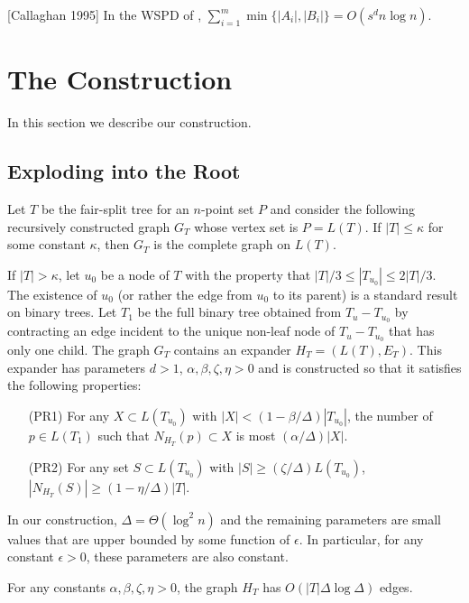 \documentclass{patmorin}
\begin{document}
\begin{lem}[Callaghan 1995]
  In the WSPD of ,
   $\sum_{i=1}^m\min\{|A_i|,|B_i|\} = O(s^d n\log n)$.
\end{lem}


\section{The Construction}

In this section we describe our construction.
\subsection{Exploding into the Root}

Let $T$ be the fair-split tree for an $n$-point set $P$ and consider
the following recursively constructed graph $G_{T}$ whose vertex set
is $P=L(T)$.  If $|T| \le \kappa$ for some constant $\kappa$, then $G_T$
is the complete graph on $L(T)$.

If $|T|>\kappa$, let $u_0$ be a node of $T$ with the property that
$|T|/3\le |T_{u_0}|\le 2|T|/3$.  The existence of $u_0$ (or rather
the edge from $u_0$ to its parent) is a standard result on binary
trees.  Let $T_1$ be the full binary tree obtained from
$T_u-T_{u_0}$ by contracting an edge incident to the unique non-leaf node
of $T_u-T_{u_0}$ that has only one child.  The graph $G_{T}$ contains
an expander $H_T=(L(T),E_T)$. This expander has parameters $d>1$,
$\alpha, \beta,\zeta,\eta > 0$ and is constructed so that it satisfies
the following properties:
\begin{enumerate}
  \item[(PR1)] For any $X\subset L(T_{u_0})$ with
    $|X|<(1-\beta/\Delta)|T_{u_0}|$, the number of $p\in L(T_1)$ such that
    $N_{H_T}(p)\subset X$ is most $(\alpha/\Delta)|X|$.

  \item[(PR2)] For any set $S\subset L(T_{u_0})$ with $|S|\ge
    (\zeta/\Delta)L(T_{u_0})$, $|N_{H_T}(S)|\ge (1-\eta/\Delta)|T|$.
\end{enumerate}
In our construction, $\Delta=\Theta(\log^2 n)$ and the remaining parameters
are small values that are upper bounded by some function of $\epsilon$. In particular, for any constant $\epsilon >0$, these parameters are also constant.

\begin{clm}
  For any constants $\alpha,\beta,\zeta,\eta>0$, the graph $H_T$ has
  $O(|T|\Delta\log\Delta)$ edges.
\end{clm}
\end{document}
